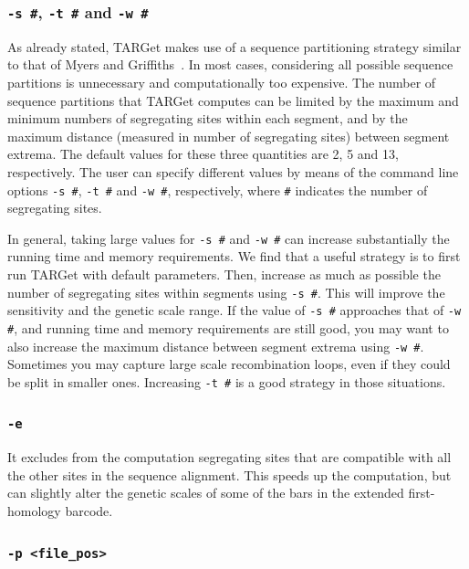 \documentclass[12pt]{article}
\begin{document}
\subsubsection*{\texttt{-s \#}, \texttt{-t \#} and \texttt{-w \#}}

As already stated, TARGet makes use of a sequence partitioning strategy similar to that of Myers and Griffiths~\cite{mg}. In most cases, considering all possible sequence partitions is  unnecessary and computationally too expensive. The number of sequence partitions that TARGet computes can be limited by the maximum and minimum numbers of segregating sites within each segment, and by the maximum distance (measured in number of segregating sites) between segment extrema. The default values for these three quantities are 2, 5 and 13, respectively. The user can specify different values by means of the command line options \texttt{-s \#}, \texttt{-t \#} and \texttt{-w \#}, respectively, where \texttt{\#} indicates the number of segregating sites.

In general, taking large values for \texttt{-s \#} and \texttt{-w \#} can increase substantially the running time and memory requirements. We find that a useful strategy is to first run TARGet with default parameters. Then, increase as much as possible the number of segregating sites within segments using \texttt{-s \#}. This will improve the sensitivity and the genetic scale range. If the value of \texttt{-s \#} approaches that of \texttt{-w \#}, and running time and memory requirements are still good, you may want to also increase the maximum distance between segment extrema using \texttt{-w \#}. Sometimes you may capture large scale recombination loops, even if they could be split in smaller ones. Increasing \texttt{-t \#} is a good strategy in those situations.

\subsubsection*{\texttt{-e}}

It excludes from the computation segregating sites that are compatible with all the other sites in the sequence alignment. This speeds up the computation, but can slightly alter the genetic scales of some of the bars in the extended first-homology barcode.

\subsubsection*{\texttt{-p <file\_pos>}}
\end{document}
